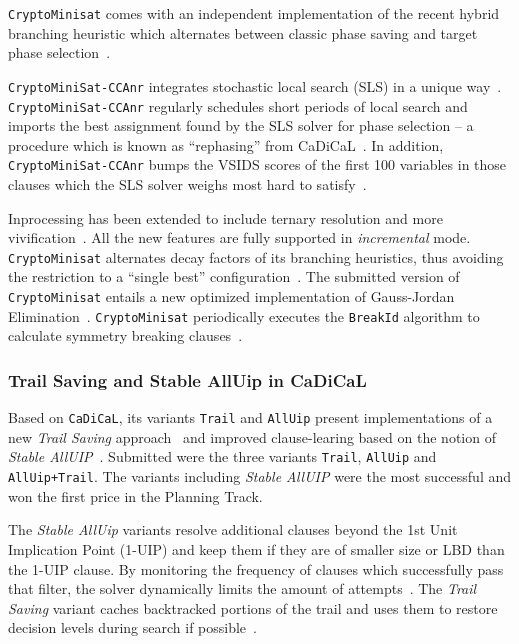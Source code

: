 \documentclass{elsarticle}
\newcommand{\solver}[1]{\texttt{#1}}
\begin{document}
\solver{CryptoMinisat} comes with an independent implementation of the recent hybrid branching heuristic which alternates between classic phase saving and target phase selection~\cite{Biere:SC2019}.

\solver{CryptoMiniSat-CCAnr} integrates stochastic local search (SLS) in a unique way~\cite{Cai:2015:CCAnr}. 
\solver{CryptoMiniSat-CCAnr} regularly schedules short periods of local search and imports the best assignment found by the SLS solver for phase selection -- a procedure which is known as ``rephasing'' from CaDiCaL~\cite{Biere:SC2019}.
In addition, \solver{CryptoMiniSat-CCAnr} bumps the VSIDS scores of the first 100 variables in those clauses which the SLS solver weighs most hard to satisfy~\cite{Soos:SC2020}.

Inprocessing has been extended to include ternary resolution and more vivification~\cite{ChuMinLi:2020:Vivification}. 
All the new features are fully supported in \emph{incremental} mode. 
\solver{CryptoMinisat} alternates decay factors of its branching heuristics, thus avoiding the restriction to a ``single best'' configuration~\cite{Soos:SC2020}. 
The submitted version of \solver{CryptoMinisat} entails a new optimized implementation of Gauss-Jordan Elimination~\cite{Soos:2020:CNFXOR}. 
\solver{CryptoMinisat} periodically executes the \solver{BreakId} algorithm to  calculate symmetry breaking clauses~\cite{Devriendt:2016:BreakId}.


\subsubsection{Trail Saving and Stable AllUip in CaDiCaL}

Based on \solver{CaDiCaL}, its variants \solver{Trail} and \solver{AllUip} present implementations of a new \emph{Trail Saving} approach~\cite{Hickey:2020:TrailSaving} and improved clause-learing based on the notion of \emph{Stable AllUIP}~\cite{Bacchus:SC2020}. 
Submitted were the three variants \solver{Trail}, \solver{AllUip} and \solver{AllUip+Trail}. 
The variants including \emph{Stable AllUIP} were the most successful and won the first price in the Planning Track. 

The \emph{Stable AllUip} variants resolve additional clauses beyond the 1st Unit Implication Point (1-UIP) and keep them if they are of smaller size or LBD than the 1-UIP clause. 
By monitoring the frequency of clauses which successfully pass that filter, the solver dynamically limits the amount of attempts~\cite{Zhang:2001:ClauseLearning,Bacchus:SC2020}.
The \emph{Trail Saving} variant caches backtracked portions of the trail and uses them to restore decision levels during search if possible~\cite{Hickey:2020:TrailSaving}. 
\end{document}
